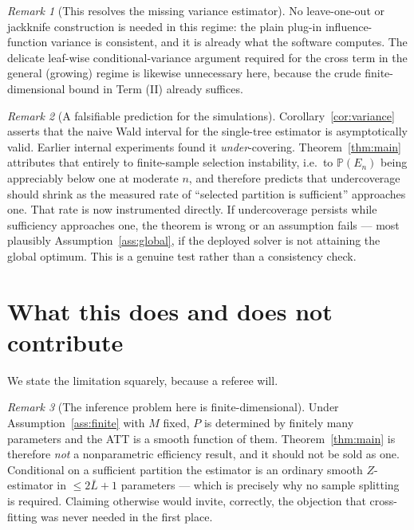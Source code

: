 \documentclass[11pt]{article}
\theoremstyle{plain}
\theoremstyle{definition}
\theoremstyle{remark}
\newtheorem{remark}{Remark}
\newcommand{\PP}{\mathbb{P}}
\begin{document}
\begin{remark}[This resolves the missing variance estimator]\label{rem:variance-resolved}
No leave-one-out or jackknife construction is needed in this regime: the plain
plug-in influence-function variance is consistent, and it is already what the
software computes. The delicate leaf-wise conditional-variance argument required
for the cross term in the general (growing) regime is likewise unnecessary here,
because the crude finite-dimensional bound in Term (II) already suffices.
\end{remark}

\begin{remark}[A falsifiable prediction for the simulations]\label{rem:prediction}
Corollary~\ref{cor:variance} asserts that the naive Wald interval for the
single-tree estimator is asymptotically valid. Earlier internal experiments found
it \emph{under}-covering. Theorem~\ref{thm:main} attributes that entirely to
finite-sample selection instability, i.e.\ to $\PP(E_n)$ being appreciably below
one at moderate $n$, and therefore predicts that undercoverage should shrink as
the measured rate of ``selected partition is sufficient'' approaches one. That
rate is now instrumented directly. If undercoverage persists while sufficiency
approaches one, the theorem is wrong or an assumption fails --- most plausibly
Assumption~\ref{ass:global}, if the deployed solver is not attaining the global
optimum. This is a genuine test rather than a consistency check.
\end{remark}

\section{What this does and does not contribute}\label{sec:contribution}

We state the limitation squarely, because a referee will.

\begin{remark}[The inference problem here is finite-dimensional]\label{rem:findim-objection}
Under Assumption~\ref{ass:finite} with $M$ fixed, $P$ is determined by finitely
many parameters and the ATT is a smooth function of them. Theorem~\ref{thm:main}
is therefore \emph{not} a nonparametric efficiency result, and it should not be
sold as one. Conditional on a sufficient partition the estimator is an ordinary
smooth $Z$-estimator in $\le 2\bar L+1$ parameters --- which is precisely why no
sample splitting is required. Claiming otherwise would invite, correctly, the
objection that cross-fitting was never needed in the first place.
\end{remark}
\end{document}
